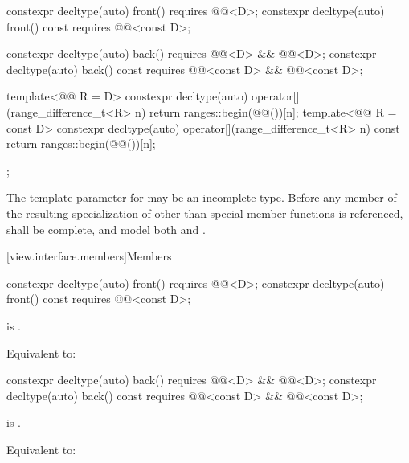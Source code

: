 \begin{codeblock}
{{    constexpr decltype(auto) front() requires @@<D>;
    constexpr decltype(auto) front() const requires @@<const D>;

    constexpr decltype(auto) back() requires @@<D> && @@<D>;
    constexpr decltype(auto) back() const
      requires @@<const D> && @@<const D>;

    template<@@ R = D>
      constexpr decltype(auto) operator[](range_difference_t<R> n) {
        return ranges::begin(@@())[n];
      }
    template<@@ R = const D>
      constexpr decltype(auto) operator[](range_difference_t<R> n) const {
        return ranges::begin(@@())[n];
      }
  };
}
\end{codeblock}

\pnum
The template parameter  for  may be an
incomplete type. Before any member of the resulting specialization of
 other than special member functions
is referenced,  shall be complete, and
model both  and .

[view.interface.members]{Members}

%
\begin{itemdecl}
constexpr decltype(auto) front() requires @@<D>;
constexpr decltype(auto) front() const requires @@<const D>;
\end{itemdecl}

\begin{itemdescr}
\pnum
\expects
{} is .

\pnum
\effects
Equivalent to: 
\end{itemdescr}

%
\begin{itemdecl}
constexpr decltype(auto) back() requires @@<D> && @@<D>;
constexpr decltype(auto) back() const
  requires @@<const D> && @@<const D>;
\end{itemdecl}

\begin{itemdescr}
\pnum
\expects
{} is .

\pnum
\effects
Equivalent to: 
\end{itemdescr}

